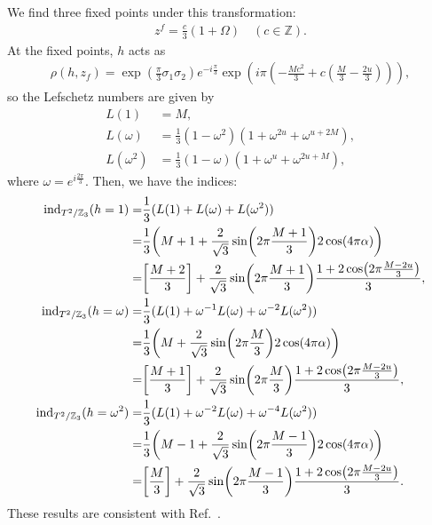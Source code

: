 \documentclass[11pt]{article}
\newcommand{\Lef}{Lefschetz }
\begin{document}
We find three fixed points under this transformation:
\begin{align}
    z^f= \frac{c}{3}(1+ \Omega) \quad (c \in \mathbb{Z}).
\end{align}
At the fixed points, $h$ acts as
\begin{align}
    \rho(h,z_f)=\exp(\frac{\pi}{3} \sigma_1 \sigma_2)e^{-i\frac{\pi}{3}}\exp(i \pi \left(- \frac{M c^{2}}{3} + c \left(\frac{M}{3} - \frac{2 u}{3}\right)\right)),
\end{align}
so the \Lef numbers are given by
\begin{align}
    L(1)&=M ,\\
    L(\omega)&= \frac{1}{3}(1-\omega^2) ( 1+\omega^{2u}+ \omega^{u+2M} ), \\
    L(\omega^2)&=\frac{1}{3}(1-\omega) (1+\omega^{u}+ \omega^{2u+M}),
\end{align}
where $\omega=e^{i\frac{2\pi}{3}}$.  
Then, we have the indices:
\begin{align}
    \text{ind}_{T^2/{\mathbb{Z}_3}}(h=1 )=& \frac{1}{3}(L(1)+L(\omega)+L(\omega^2) ) \nonumber \\
    =&\frac{1}{3}\qty( M+1 +\frac{2}{\sqrt{3}} \sin(2\pi \frac{M+1}{3}) 2\cos (4\pi \alpha) )\nonumber \\
    =& \qty[ \frac{M+2}{3}] +\frac{2}{\sqrt{3}} \sin(2\pi \frac{M+1}{3}) \frac{1+ 2\cos (2\pi \frac{M-2u}{3})}{3}, \\
    \text{ind}_{T^2/{\mathbb{Z}_3}}({h=\omega })=& \frac{1}{3}(L(1)+ \omega^{-1} L(\omega)+ \omega^{-2} L(\omega^2) ) \nonumber\\
    =&\frac{1}{3}\qty( M +\frac{2}{\sqrt{3}} \sin(2\pi \frac{M}{3}) 2\cos (4\pi \alpha) ) \nonumber \\
    =& \qty[ \frac{M+1}{3}] +\frac{2}{\sqrt{3}} \sin(2\pi \frac{M}{3}) \frac{1+ 2\cos (2\pi \frac{M-2u}{3})}{3},\\
    \text{ind}_{T^2/{\mathbb{Z}_3}}({h=\omega^2 })=& \frac{1}{3}(L(1)+ \omega^{-2} L(\omega)+ \omega^{-4} L(\omega^2) ) \nonumber \\
    =&\frac{1}{3}\qty( M-1 +\frac{2}{\sqrt{3}} \sin(2\pi \frac{M-1}{3}) 2\cos (4\pi \alpha) ) \nonumber \\
    =& \qty[ \frac{M}{3}] +\frac{2}{\sqrt{3}} \sin(2\pi \frac{M-1}{3}) \frac{1+ 2\cos (2\pi \frac{M-2u}{3})}{3}.
\end{align}
These results are consistent with Ref.~\cite{Sakamoto:2020pev,Kobayashi:2022tti,Imai:2022bke}.
\end{document}
